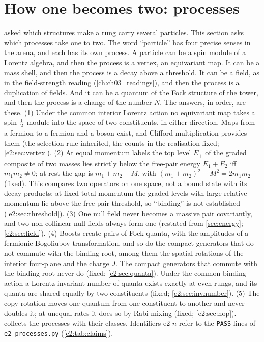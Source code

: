 
\section{How one becomes two: processes}
\label{e2:sec:main}

 asked which structures make a rung carry several particles. This section asks which processes take one to two. The word
``particle'' has four precise senses in the arena, and each has its own process. A particle can be a spin module of a Lorentz algebra, and
then the process is a vertex, an equivariant map. It can be a mass shell, and then the process is a decay above a threshold. It can be a
field, as in the field-strength reading (\cref{ch:ch03_readings}), and then the process is a duplication of fields. And it can be a quantum of the Fock
structure of the tower, and then the process is a change of the number $N$. The answers, in order, are these.
(1) Under the common interior Lorentz action no equivariant map takes a spin-$\tfrac12$ module into the space of two constituents, in either
direction. Maps from a fermion to a fermion and a boson exist, and Clifford multiplication provides them (the selection rule inherited, the
counts in the realisation fixed; \cref{e2:sec:vertex}). (2) At equal momentum labels the top level $E_+$ of the graded composite of two
masses lies strictly below the free-pair energy $E_1+E_2$ iff $m_1m_2\neq0$; at rest the gap is $m_1+m_2-M$, with $(m_1+m_2)^2-M^2=2m_1m_2$
(fixed). This compares two operators on one space, not a bound state with its decay products: at fixed total momentum the graded
levels with large relative momentum lie above the free-pair threshold, so ``binding'' is not established (\cref{e2:sec:threshold}). (3) One null field never becomes a massive pair covariantly, and two non-collinear null fields always form one
(restated from \cref{sec:energy}; \cref{e2:sec:field}). (4) Boosts create pairs of Fock quanta, with the amplitudes of a fermionic Bogoliubov
transformation, and so do the compact generators that do not commute with the binding root, among them the spatial rotations of the interior
four-plane and the charge $J$. The compact generators that commute with the binding root never do (fixed; \cref{e2:sec:quanta}). Under the
common binding action a Lorentz-invariant number of quanta exists exactly at even rungs, and its quanta are shared equally by two constituents
(fixed; \cref{e2:sec:invnumber}). (5) The copy rotation moves one quantum from one constituent to another and never doubles it; at unequal
rates it does so by Rabi mixing (fixed; \cref{e2:sec:hop}).  collects the processes with their classes. Identifiers
e2-$n$ refer to the \texttt{PASS} lines of \texttt{e2\_processes.py} (\cref{e2:tab:claims}).


